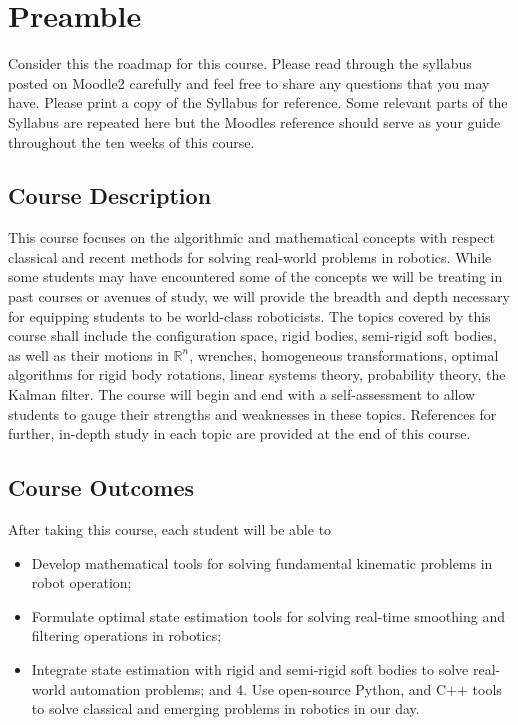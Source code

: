 \chapter{Preamble}
\label{chap:intro}

Consider this the roadmap for this course.  Please read through the syllabus posted on Moodle2 carefully and feel free to share any questions that you may have.  Please print a copy of the Syllabus for reference. Some relevant parts of the Syllabus are repeated here but the Moodles reference should serve as your guide throughout the ten weeks of this course.

\section{Course Description}
%
This course focuses on the algorithmic and mathematical concepts  with respect classical and recent methods for solving real-world problems in robotics. While some students may have encountered some of the concepts we will be treating in past courses or avenues of study, we will provide the breadth and depth necessary for equipping students to be world-class roboticists. The topics covered by this course shall include the configuration space, rigid bodies, semi-rigid soft bodies, as well as their motions in $\mathbb{R}^n$,  wrenches, homogeneous transformations, optimal algorithms for rigid body rotations, linear systems theory, probability theory, the Kalman filter. The course will begin and end with a self-assessment to allow students to gauge their strengths and weaknesses in these topics. References for further, in-depth study in each topic are provided at the end of this course.


\section{Course Outcomes}
After taking this course, each student will be able to

\begin{itemize}
\item Develop mathematical tools for solving fundamental kinematic problems in robot operation;
%
\item  Formulate optimal state estimation tools for solving real-time smoothing and filtering operations in robotics;
%
\item Integrate state estimation with rigid and semi-rigid soft bodies to solve real-world automation problems; and
%
4.	Use open-source Python, and C++ tools to solve classical and emerging problems in robotics in our day.
\end{itemize}

